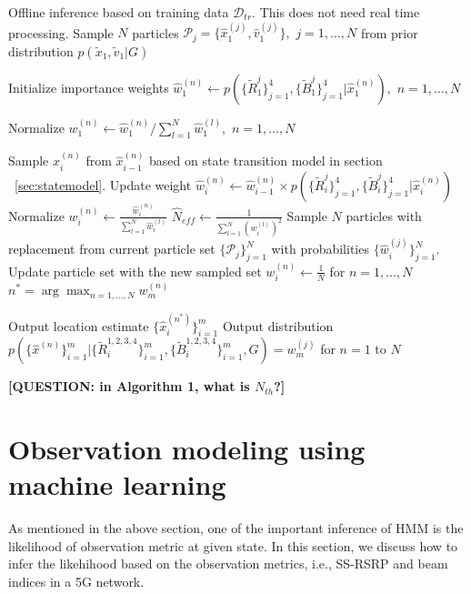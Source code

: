 \documentclass[conference, 10pt]{IEEEtran}
\begin{document}
\begin{algorithm}
\caption{$5GLocalizeAlgo(\mathcal{D}_{tr},G,N_{th})$}
\label{alg:LocalizeUEpf}
\begin{algorithmic}[1]
\State Offline inference based on training data $\mathcal{D}_{tr}$. This does not need real time processing.
\State Sample $N$ particles $\mathcal{P}_j = \{\hat{x}_1^{(j)},\hat{v}_1^{(j)}\},$ $j=1,\hdots , N$ 
from prior distribution $p(\tilde{x}_1, \tilde{v}_1|G)$ 

\State Initialize importance weights $\hat{w}_1^{(n)} \gets p(\{\tilde{R}^j_1\}_{j=1}^4,\{\tilde{B}^j_1\}_{j=1}^4|\hat{x}_1^{(n)}),$ $n=1,\hdots , N$

\State Normalize $w_1^{(n)} \gets \hat{w}_1^{(n)}/\sum_{l=1}^N \hat{w}_1^{(l)},$ $n=1,\hdots , N$

		\State Sample $\hat{x}_i^{(n)}$ from $\hat{x}_{i-1}^{(n)}$ based on state transition model in section ~\ref{sec:statemodel}.
		\State Update weight $\hat{w}_i^{(n)} \gets \hat{w}_{i-1}^{(n)} \times p(\{\tilde{R}^j_i\}_{j=1}^4, \{\tilde{B}^j_i\}_{j=1}^4|\hat{x}_{i}^{(n)})$ 
	\EndFor
	\State Normalize $w_i^{(n)} \gets \frac{\hat{w}_i^{(n)}}{\sum_{l=1}^N \hat{w}_i^{(l)}}$
	\State $\hat{N}_{eff} \gets \frac{1}{\sum_{l=1}^N (w_{i}^{(l)})^2}$
		\State Sample $N$ particles with replacement from current particle set $\{\mathcal{P}_j\}_{j=1}^N$ with probabilities $\{\hat{w}_i^{(j)}\}_{j=1}^N.$ Update particle set with the new sampled set
		\State $w_i^{(n)} \gets \frac{1}{N}$ for $n=1,\hdots , N$
	\EndIf
\EndFor
\State $n^* = \arg \max_{n = 1 , \hdots, N} w_m^{(n)}$

\State Output location estimate $\{\hat{x}_i^{(n^*)}\}_{i=1}^m$ 
\State Output distribution \\
$p(\{\hat{x}^{(n)}\}_{i=1}^m|\{\tilde{R}^{1,2,3,4}_i\}_{i=1}^m,\{\tilde{B}^{1,2,3,4}_i\}_{i=1}^m,G) = w_m^{(j)}$ for $n=1$ to $N$
\end{algorithmic}
\end{algorithm}  

 \textbf{[QUESTION: in Algorithm 1, what is $N_{th}$?]} 

\section{Observation modeling using machine learning}
\label{sec:channel-model}
As mentioned in the above section, one of the important inference of HMM is the likelihood of observation metric at given state. In this section, we discuss how to infer the likehihood based 
on the observation metrics, i.e., SS-RSRP and beam indices in a 5G network. 
\end{document}
